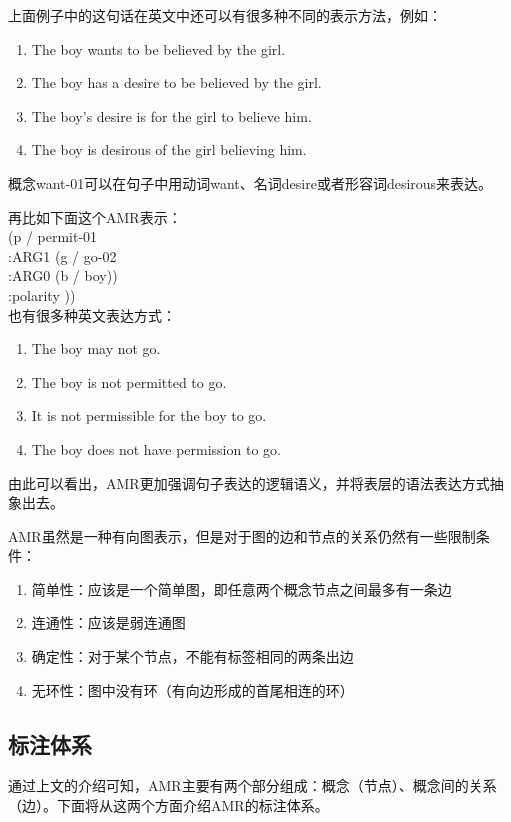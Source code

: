 \documentclass[master, winfont]{njuthesis}
\begin{document}
上面例子中的这句话在英文中还可以有很多种不同的表示方法，例如：
\begin{enumerate}
  \item The boy wants to be believed by the girl.
  \item The boy has a desire to be believed by the girl.
  \item The boy’s desire is for the girl to believe him.
  \item The boy is desirous of the girl believing him.
\end{enumerate}

概念want-01可以在句子中用动词want、名词desire或者形容词desirous来表达。

再比如下面这个AMR表示：\\
(p / permit-01 \\
     :ARG1 (g / go-02\\
              :ARG0 (b / boy))\\
     :polarity ))\\

也有很多种英文表达方式：
\begin{enumerate}
  \item The boy may not go.
  \item The boy is not permitted to go.
  \item It is not permissible for the boy to go.
  \item The boy does not have permission to go.
\end{enumerate}

由此可以看出，AMR更加强调句子表达的逻辑语义，并将表层的语法表达方式抽象出去。

AMR虽然是一种有向图表示，但是对于图的边和节点的关系仍然有一些限制条件\cite{Flanigan2014}：
\begin{enumerate}
  \item 简单性：应该是一个简单图，即任意两个概念节点之间最多有一条边
  \item 连通性：应该是弱连通图
  \item 确定性：对于某个节点，不能有标签相同的两条出边
  \item 无环性：图中没有环（有向边形成的首尾相连的环）
\end{enumerate}


\subsection{标注体系}
通过上文的介绍可知，AMR主要有两个部分组成：概念（节点）、概念间的关系（边）。下面将从这两个方面介绍AMR的标注体系。
\end{document}
